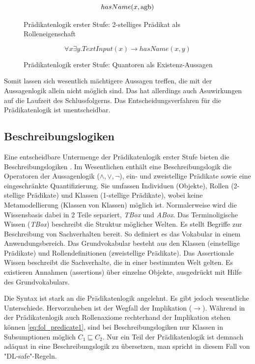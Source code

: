 \documentclass[runningheads,a4paper]{llncs}
\begin{document}
\begin{figure}
\begin{equation}
hasName(x, \textnormal{agb})
\label{eq:fol_predicate2}
\end{equation}
\caption{Prädikatenlogik erster Stufe: 2-stelliges Prädikat als Rolleneigenschaft}
\end{figure}

\begin{figure}
\begin{equation}
\forall x\exists y. TextInput(x) \to hasName(x, y)
\label{eq:fol_quantors}
\end{equation}
\caption{Prädikatenlogik erster Stufe: Quantoren als Existenz-Aussagen}
\end{figure}

Somit lassen sich wesentlich mächtigere Aussagen treffen, die mit der Aussagenlogik allein nicht möglich sind.
Das hat allerdings auch Asuwirkungen auf die Laufzeit des Schlussfolgerns.
Das Entscheidungsverfahren für die Prädikatenlogik ist unentscheidbar. 
\\

\subsection{Beschreibungslogiken}
\label{sec:desclogic}

Eine entscheidbare Untermenge der Prädikatenlogik erster Stufe bieten die Beschreibungslogiken \cite{foundations}.
Im Wesentlichen enthält eine Beschreibungslogik die Operatoren der Aussagenlogik (\(\land, \lor, \neg\)), ein- und zweistellige Prädikate sowie eine eingeschränkte Quantifizierung.
Sie umfassen Individuen (Objekte), Rollen (2-stellige Prädikate) und Klassen (1-stellige Prädikate), wobei keine Metamodellierung (Klassen von Klassen) möglich ist.
Normalerweise wird die Wissensbasis dabei in 2 Teile separiert, \textit{TBox} und \textit{ABox}. 
Das Terminoligische Wissen (\textit{TBox}) beschreibt die Struktur möglicher Welten. 
Es stellt Begriffe zur Beschreibung von Sachverhalten bereit. 
So definiert es das Vokabular in einem Anwendungsbereich. 
Das Grundvokabular besteht aus den Klassen (einstellige Prädikate) und Rollendefinitionen (zweistellige Prädikate). 
Das Assertionale Wissen beschreibt die Sachverhalte, die in einer bestimmten Welt gelten. 
Es existieren Annahmen (assertions) über einzelne Objekte, ausgedrückt mit
Hilfe des Grundvokabulars.

Die Syntax ist stark an die Prädikatenlogik angelehnt. 
Es gibt jedoch wesentliche Unterschiede. 
Hervorzuheben ist der Wegfall der Implikation (\(\to\)). 
Während in der Prädikatenlogik auch Rollenaxiome rechterhand der Implikation stehen können \eqref{eq:fol_predicate1}, sind bei Beschreibungslogiken nur Klassen in Subsumptionen möglich \(C_1 \sqsubseteq C_2\).
Nur ein Teil der Prädikatenlogik ist demnach adäquat in eine Beschreibungslogik zu übersetzen, man spricht in diesem Fall von "{}DL-safe"{}-Regeln. 
\end{document}
